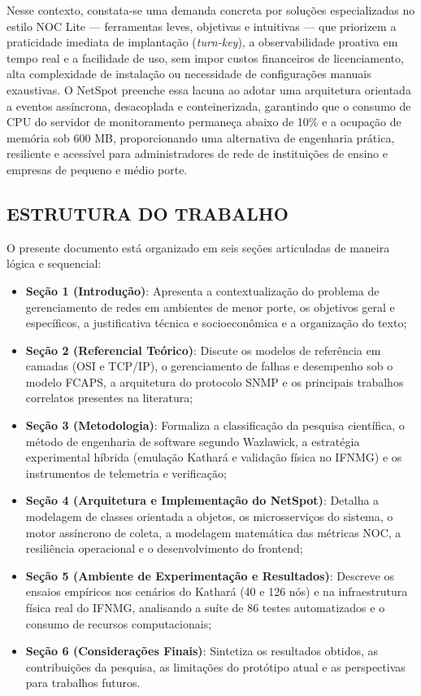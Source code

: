 \documentclass[12pt,a4paper]{article}
\begin{document}
Nesse contexto, constata-se uma demanda concreta por soluções especializadas no estilo NOC Lite — ferramentas leves, objetivas e intuitivas — que priorizem a praticidade imediata de implantação (\textit{turn-key}), a observabilidade proativa em tempo real e a facilidade de uso, sem impor custos financeiros de licenciamento, alta complexidade de instalação ou necessidade de configurações manuais exaustivas. O NetSpot preenche essa lacuna ao adotar uma arquitetura orientada a eventos assíncrona, desacoplada e conteinerizada, garantindo que o consumo de CPU do servidor de monitoramento permaneça abaixo de 10\% e a ocupação de memória sob 600 MB, proporcionando uma alternativa de engenharia prática, resiliente e acessível para administradores de rede de instituições de ensino e empresas de pequeno e médio porte.

\subsection{ESTRUTURA DO TRABALHO}
O presente documento está organizado em seis seções articuladas de maneira lógica e sequencial:
\begin{itemize}[leftmargin=1.25cm]
\item \textbf{Seção 1 (Introdução)}: Apresenta a contextualização do problema de gerenciamento de redes em ambientes de menor porte, os objetivos geral e específicos, a justificativa técnica e socioeconômica e a organização do texto;
\item \textbf{Seção 2 (Referencial Teórico)}: Discute os modelos de referência em camadas (OSI e TCP/IP), o gerenciamento de falhas e desempenho sob o modelo FCAPS, a arquitetura do protocolo SNMP e os principais trabalhos correlatos presentes na literatura;
\item \textbf{Seção 3 (Metodologia)}: Formaliza a classificação da pesquisa científica, o método de engenharia de software segundo Wazlawick, a estratégia experimental híbrida (emulação Kathará e validação física no IFNMG) e os instrumentos de telemetria e verificação;
\item \textbf{Seção 4 (Arquitetura e Implementação do NetSpot)}: Detalha a modelagem de classes orientada a objetos, os microsserviços do sistema, o motor assíncrono de coleta, a modelagem matemática das métricas NOC, a resiliência operacional e o desenvolvimento do frontend;
\item \textbf{Seção 5 (Ambiente de Experimentação e Resultados)}: Descreve os ensaios empíricos nos cenários do Kathará (40 e 126 nós) e na infraestrutura física real do IFNMG, analisando a suíte de 86 testes automatizados e o consumo de recursos computacionais;
\item \textbf{Seção 6 (Considerações Finais)}: Sintetiza os resultados obtidos, as contribuições da pesquisa, as limitações do protótipo atual e as perspectivas para trabalhos futuros.
\end{itemize}
\end{document}
